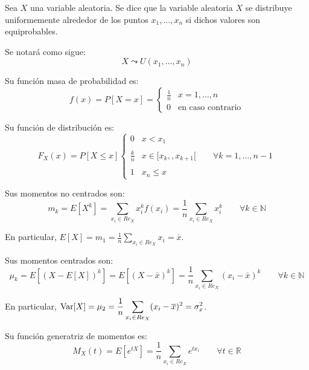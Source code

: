 \begin{definicion}
    Sea $X$ una variable aleatoria. Se dice que la variable aleatoria $X$ se distribuye uniformemente alrededor de los puntos $x_1,\dots, x_n$ si dichos valores son equiprobables.

    Se notará como sigue:
    \begin{equation*}
        X \leadsto U(x_1,\dots, x_n)
    \end{equation*}
\end{definicion}

Su función masa de probabilidad es:
\begin{equation*}
    f(x) = P[X=x] = \left\{\begin{array}{cc}
        \frac{1}{n} & x=1,\dots, n \\
        0 & \text{en caso contrario}
    \end{array}\right.
\end{equation*}

Su función de distribución es:
\begin{equation*}
    F_X(x) = P[X\leq x] \left\{\begin{array}{cl}
        0 & x<x_1 \\ \\
        \frac{k}{n} & x\in [x_k,, x_{k+1}[ \qquad \forall k=1,\dots, n-1\\ \\
        1 & x_n\leq x
    \end{array}\right.
\end{equation*}

Sus momentos no centrados son:
\begin{equation*}
    m_k = E[X^k]
    = \sum_{x_i\in Re_X}x_i^kf(x_i)
    = \frac{1}{n} \sum_{x_i\in Re_X}x_i^k
    \qquad \forall k\in \mathbb{N}
\end{equation*}

En particular, $\displaystyle E[X]=m_1 = \frac{1}{n} \sum_{x_i\in Re_X}x_i = \bar{x}$.

Sus momentos centrados son:
\begin{equation*}
    \mu_k = E[(X-E[X])^k]
    = E[(X-\bar{x})^k]
    = \frac{1}{n} \sum_{x_i\in Re_X}(x_i-\bar{x})^k   
    \qquad \forall k\in \mathbb{N}
\end{equation*}

En particular, $\displaystyle \operatorname{Var}[X]=\mu_2 = \frac{1}{n} \sum_{x_i\in Re_X}(x_i-\overline{x})^2 = \sigma_{x}^2$.

Su función generatriz de momentos es:
\begin{equation*}
    M_X(t) = E[e^{tX}] = \frac{1}{n} \sum_{x_i\in Re_X}e^{tx_i}     
    \qquad \forall t\in \mathbb{R}
\end{equation*}

